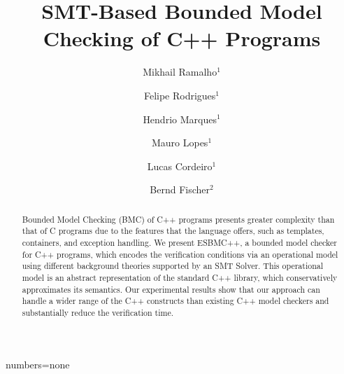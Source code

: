 \documentclass[a4paper]{llncs}
\begin{document}
{numbers=none}
\lstset{language=C,basicstyle=\small}
\lstset{numbers=left, numberstyle=\tiny, stepnumber=1, numbersep=5pt}
\lstset{tabsize=2}
\lstset{firstnumber=1}
\lstset{frame=single}


\title{SMT-Based Bounded Model Checking of C++ Programs}
\author{Mikhail Ramalho$^1$ 	\and
	Felipe Rodrigues$^1$   	\and
	Hendrio Marques$^1$   	\and
	Mauro Lopes$^1$   	\and
	Lucas Cordeiro$^1$   	\and
	Bernd Fischer$^2$}

\maketitle

\begin{abstract}
Bounded Model Checking (BMC) of C++ programs presents greater
complexity than that of C programs due to the features that the language offers, such as
templates, containers, and exception handling. We present ESBMC++, a bounded
model checker for C++ programs, which encodes the verification conditions via
an operational model using different background theories supported
by an SMT Solver. This operational model is an abstract representation of
the standard C++ library, which conservatively approximates its semantics. Our
experimental results show that our approach can handle a wider range of the C++
constructs than existing C++ model checkers and substantially reduce the verification time.
\end{abstract}

\end{document}
